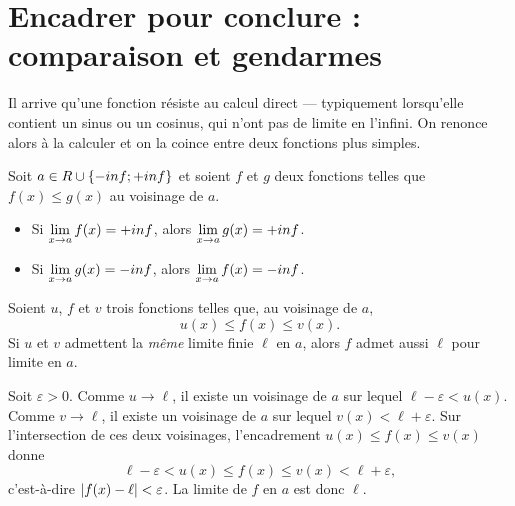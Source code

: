 \section{Encadrer pour conclure : comparaison et gendarmes}

Il arrive qu'une fonction résiste au calcul direct — typiquement lorsqu'elle
contient un sinus ou un cosinus, qui n'ont pas de limite en l'infini. On
renonce alors à la calculer et on la coince entre deux fonctions plus simples.

\begin{theoreme}
Soit $a \in R \cup \{-inf ; +inf\}$ et soient $f$ et $g$ deux fonctions
telles que $f(x) \leq g(x)$ au voisinage de $a$.
\begin{itemize}[leftmargin=1.4em, itemsep=0.2em]
  \item Si $\limx{a} f(x) = +\infty$, alors $\limx{a} g(x) = +\infty$.
  \item Si $\limx{a} g(x) = -\infty$, alors $\limx{a} f(x) = -\infty$.
\end{itemize}
\end{theoreme}

\begin{theoreme}
Soient $u$, $f$ et $v$ trois fonctions telles que, au voisinage de $a$,
\[
  u(x) \leq f(x) \leq v(x).
\]
Si $u$ et $v$ admettent la \emph{même} limite finie $\ell$ en $a$, alors $f$
admet aussi $\ell$ pour limite en $a$.
\end{theoreme}

\begin{demonstration}
Soit $\varepsilon > 0$. Comme $u \to \ell$, il existe un voisinage de $a$ sur
lequel $\ell - \varepsilon < u(x)$. Comme $v \to \ell$, il existe un voisinage
de $a$ sur lequel $v(x) < \ell + \varepsilon$. Sur l'intersection de ces deux
voisinages, l'encadrement $u(x) \leq f(x) \leq v(x)$ donne
\[
  \ell - \varepsilon < u(x) \leq f(x) \leq v(x) < \ell + \varepsilon,
\]
c'est-à-dire $\left|f(x) - \ell\right| < \varepsilon$. La limite de $f$ en $a$ est
donc $\ell$.
\end{demonstration}

